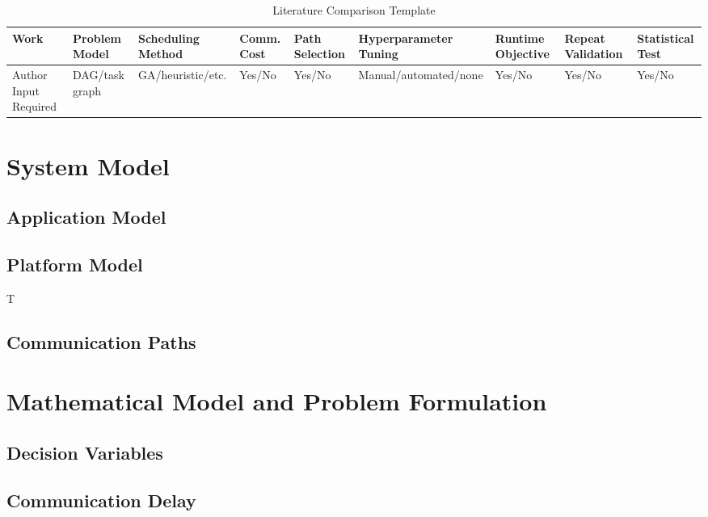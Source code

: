 \documentclass{ieeeaccess}
\begin{document}
\begin{table}[t]
\caption{Literature Comparison Template}
\label{tab:related_work_comparison}
\centering
\begin{tabular}{p{2.3cm}p{2.2cm}p{2.1cm}p{1.7cm}p{1.5cm}p{2.0cm}p{1.7cm}p{1.8cm}p{2.0cm}}
\toprule
Work & Problem Model & Scheduling Method & Comm. Cost & Path Selection & Hyperparameter Tuning & Runtime Objective & Repeat Validation & Statistical Test \\
\midrule
Author Input Required & DAG/task graph & GA/heuristic/etc. & Yes/No & Yes/No & Manual/automated/none & Yes/No & Yes/No & Yes/No \\
\bottomrule
\end{tabular}
\end{table}

\section{System Model}
\label{sec:system_model}

\subsection{Application Model}


\subsection{Platform Model}

T

\subsection{Communication Paths}



\section{Mathematical Model and Problem Formulation}
\label{sec:mathematical_model}

\subsection{Decision Variables}


\subsection{Communication Delay}
\end{document}
